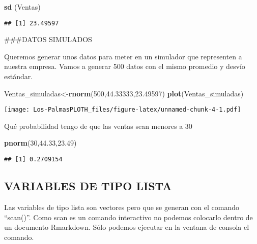 \documentclass[
]{article}
\newenvironment{Shaded}{\begin{snugshade}}{\end{snugshade}}
\newcommand{\DecValTok}[1]{\textcolor[rgb]{0.00,0.00,0.81}{#1}}
\newcommand{\FloatTok}[1]{\textcolor[rgb]{0.00,0.00,0.81}{#1}}
\newcommand{\FunctionTok}[1]{\textcolor[rgb]{0.13,0.29,0.53}{\textbf{#1}}}
\newcommand{\NormalTok}[1]{#1}
\newcommand{\OtherTok}[1]{\textcolor[rgb]{0.56,0.35,0.01}{#1}}
\begin{document}
\begin{Shaded}
\begin{Highlighting}[]
\FunctionTok{sd}\NormalTok{ (Ventas)}
\end{Highlighting}
\end{Shaded}

\begin{verbatim}
## [1] 23.49597
\end{verbatim}

\#\#\#DATOS SIMULADOS

Queremos generar unos datos para meter en un simulador que representen a
nuestra empresa. Vamos a generar 500 datos con el mismo promedio y
desvío estándar.

\begin{Shaded}
\begin{Highlighting}[]
\NormalTok{Ventas\_simuladas}\OtherTok{\textless{}{-}}\FunctionTok{rnorm}\NormalTok{(}\DecValTok{500}\NormalTok{,}\FloatTok{44.33333}\NormalTok{,}\FloatTok{23.49597}\NormalTok{)}
\FunctionTok{plot}\NormalTok{(Ventas\_simuladas)}
\end{Highlighting}
\end{Shaded}

\texttt{[image: Los-PalmasPLOTH\_files/figure-latex/unnamed-chunk-4-1.pdf]}

Qué probabilidad tengo de que las ventas sean menores a 30

\begin{Shaded}
\begin{Highlighting}[]
\FunctionTok{pnorm}\NormalTok{(}\DecValTok{30}\NormalTok{,}\FloatTok{44.33}\NormalTok{,}\FloatTok{23.49}\NormalTok{)}
\end{Highlighting}
\end{Shaded}

\begin{verbatim}
## [1] 0.2709154
\end{verbatim}

\hypertarget{variables-de-tipo-lista}{%
\subsection{VARIABLES DE TIPO LISTA}\label{variables-de-tipo-lista}}

Las variables de tipo lista son vectores pero que se generan con el
comando ``scan()''. Como scan es un comando interactivo no podemos
colocarlo dentro de un documento Rmarkdown. Sólo podemos ejecutar en la
ventana de consola el comando.
\end{document}
